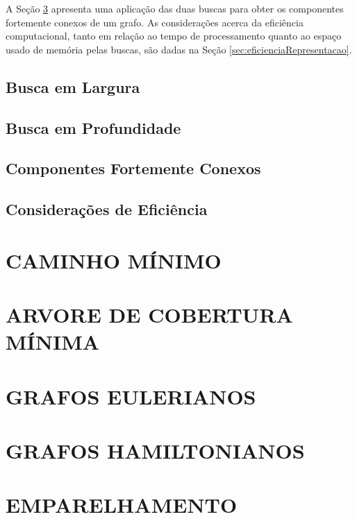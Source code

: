 \documentclass[
12pt,
a4paper,
semrecuonosumario,
sumario = abnt-6027-2012]{report}
\begin{document}
	A Seção \ref{sec:compFC} apresenta uma aplicação das duas buscas para obter os componentes fortemente conexos de um grafo. As considerações acerca da eficiência computacional, tanto em relação ao tempo de processamento quanto ao espaço usado de memória pelas buscas, são dadas na Seção \ref{sec:eficienciaRepresentacao}.

	\section{Busca em Largura}\label{sec:buscaLarg}

	\section{Busca em Profundidade}\label{sec:buscaProf}

	\section{Componentes Fortemente Conexos}\label{sec:compFC}

	\section{Considerações de Eficiência}\label{sec:eficienciaBusca}

	\chapter{CAMINHO MÍNIMO}\label{cap:caminhoMinimo}


	\chapter{ARVORE DE COBERTURA MÍNIMA}\label{cap:arvCobMinima}


	\chapter{GRAFOS EULERIANOS}\label{cap:grafosEulerianos}


	\chapter{GRAFOS HAMILTONIANOS}\label{cap:grafosHamiltonianos}


	\chapter{EMPARELHAMENTO}\label{cap:emparelhamento}
\end{document}
